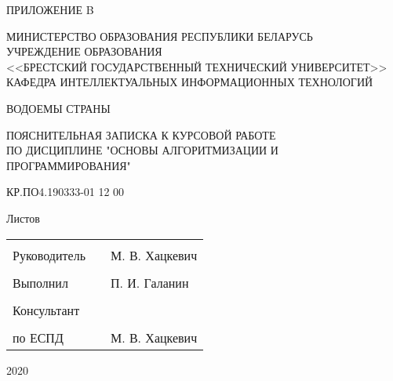 \documentclass[12pt, a4paper]{article}
\begin{document}
\begin{titlepage}

    \begin{flushright}
        ПРИЛОЖЕНИЕ B
    \end{flushright}

    \vfill

    \begin{center}
        МИНИСТЕРСТВО ОБРАЗОВАНИЯ РЕСПУБЛИКИ БЕЛАРУСЬ\\
        УЧРЕЖДЕНИЕ ОБРАЗОВАНИЯ\\
        <<БРЕСТСКИЙ ГОСУДАРСТВЕННЫЙ ТЕХНИЧЕСКИЙ УНИВЕРСИТЕТ>>\\
        КАФЕДРА ИНТЕЛЛЕКТУАЛЬНЫХ ИНФОРМАЦИОННЫХ ТЕХНОЛОГИЙ\\
    \end{center}

    \vfill

    \begin{center}
        ВОДОЕМЫ СТРАНЫ
    \end{center}

    \vfill

    \begin{center}
        ПОЯСНИТЕЛЬНАЯ ЗАПИСКА К КУРСОВОЙ РАБОТЕ\\
        ПО ДИСЦИПЛИНЕ "ОСНОВЫ АЛГОРИТМИЗАЦИИ И ПРОГРАММИРОВАНИЯ"\\
    \end{center}

    \vfill

    \begin{center}
    КР.ПО4.190333-01 12 00
    \end{center}

    \vfill

    \begin{center}
    Листов \pageref{link:lastPage}
    \end{center}

    \vfill

    \begin{tabular}{ p{5cm} p{5cm} p{5cm}  }
        \multicolumn{3}{c}{}\\
        Руководитель & & М. В. Хацкевич\\
        &&\\
        Выполнил & & П. И. Галанин\\
        &&\\
        Консультант & & \\
        &&\\
        по ЕСПД & & М. В. Хацкевич\\
    \end{tabular}
        
    \vfill

    \begin{center}
        2020
    \end{center}
\end{titlepage}
\newpage
\end{document}
